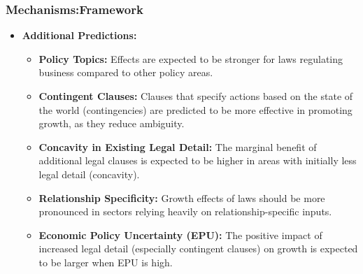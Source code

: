 \documentclass{beamer}
\begin{document}
\begin{frame}
    \frametitle{Mechanisms:Framework}
    \footnotesize
    \begin{itemize}
         \item \textbf{Additional Predictions:}
        \begin{itemize}
        \item \textbf{Policy Topics:} Effects are expected to be stronger for laws regulating business compared to other policy areas.
        \item \textbf{Contingent Clauses:} Clauses that specify actions based on the state of the world (contingencies) are predicted to be more effective in promoting growth, as they reduce ambiguity.
        \item \textbf{Concavity in Existing Legal Detail:} The marginal benefit of additional legal clauses is expected to be higher in areas with initially less legal detail (concavity).
        \item \textbf{Relationship Specificity:} Growth effects of laws should be more pronounced in sectors relying heavily on relationship-specific inputs.
        \item \textbf{Economic Policy Uncertainty (EPU):} The positive impact of increased legal detail (especially contingent clauses) on growth is expected to be larger when EPU is high.
        \end{itemize}
    \end{itemize}
\end{frame}
\end{document}
